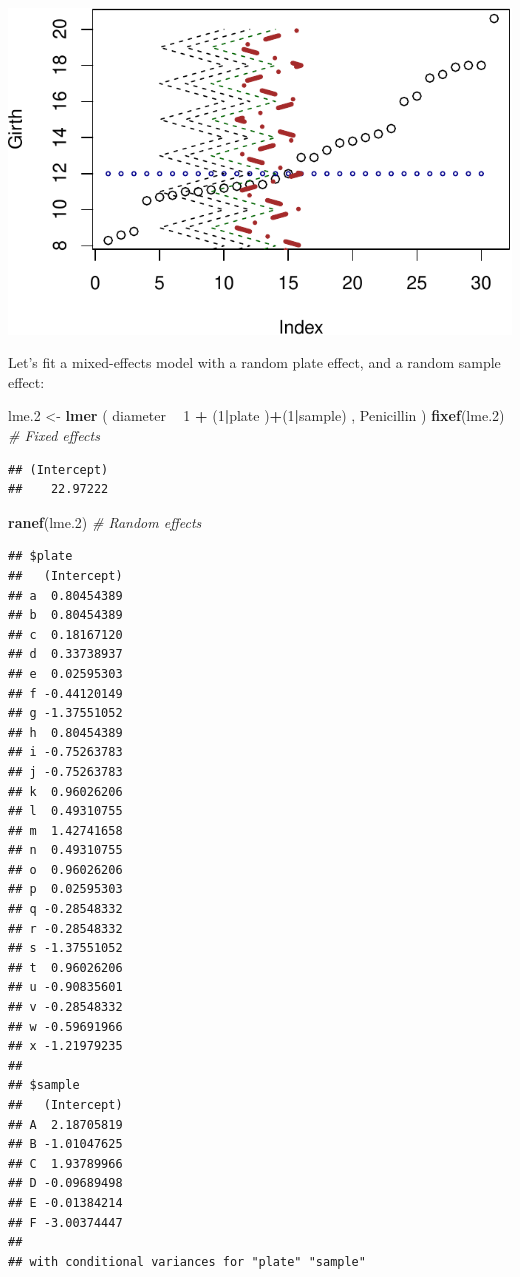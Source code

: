 \documentclass[]{book}
\newenvironment{Shaded}{\begin{snugshade}}{\end{snugshade}}
\newcommand{\CommentTok}[1]{\textcolor[rgb]{0.56,0.35,0.01}{\textit{#1}}}
\newcommand{\DecValTok}[1]{\textcolor[rgb]{0.00,0.00,0.81}{#1}}
\newcommand{\FloatTok}[1]{\textcolor[rgb]{0.00,0.00,0.81}{#1}}
\newcommand{\KeywordTok}[1]{\textcolor[rgb]{0.13,0.29,0.53}{\textbf{#1}}}
\newcommand{\NormalTok}[1]{#1}
\newcommand{\OperatorTok}[1]{\textcolor[rgb]{0.81,0.36,0.00}{\textbf{#1}}}
\newcommand{\StringTok}[1]{\textcolor[rgb]{0.31,0.60,0.02}{#1}}
\theoremstyle{definition}
\theoremstyle{definition}
\theoremstyle{definition}
\theoremstyle{remark}
\begin{document}
\includegraphics[width=0.5\linewidth]{Rcourse_files/figure-latex/unnamed-chunk-203-1}

Let's fit a mixed-effects model with a random plate effect, and a random sample effect:

\begin{Shaded}
\begin{Highlighting}[]
\NormalTok{lme}\FloatTok{.2}\NormalTok{ <-}\StringTok{ }\KeywordTok{lmer}\NormalTok{ ( diameter }\OperatorTok{~}\StringTok{  }\DecValTok{1}  \OperatorTok{+}\StringTok{ }\NormalTok{(}\DecValTok{1}\OperatorTok{|}\NormalTok{plate )}\OperatorTok{+}\NormalTok{(}\DecValTok{1}\OperatorTok{|}\NormalTok{sample) , Penicillin )}
\KeywordTok{fixef}\NormalTok{(lme}\FloatTok{.2}\NormalTok{) }\CommentTok{# Fixed effects}
\end{Highlighting}
\end{Shaded}

\begin{verbatim}
## (Intercept) 
##    22.97222
\end{verbatim}

\begin{Shaded}
\begin{Highlighting}[]
\KeywordTok{ranef}\NormalTok{(lme}\FloatTok{.2}\NormalTok{) }\CommentTok{# Random effects}
\end{Highlighting}
\end{Shaded}

\begin{verbatim}
## $plate
##   (Intercept)
## a  0.80454389
## b  0.80454389
## c  0.18167120
## d  0.33738937
## e  0.02595303
## f -0.44120149
## g -1.37551052
## h  0.80454389
## i -0.75263783
## j -0.75263783
## k  0.96026206
## l  0.49310755
## m  1.42741658
## n  0.49310755
## o  0.96026206
## p  0.02595303
## q -0.28548332
## r -0.28548332
## s -1.37551052
## t  0.96026206
## u -0.90835601
## v -0.28548332
## w -0.59691966
## x -1.21979235
## 
## $sample
##   (Intercept)
## A  2.18705819
## B -1.01047625
## C  1.93789966
## D -0.09689498
## E -0.01384214
## F -3.00374447
## 
## with conditional variances for "plate" "sample"
\end{verbatim}
\end{document}
